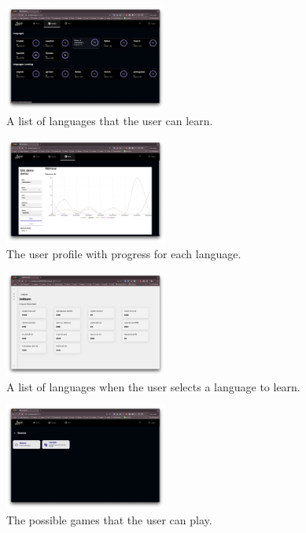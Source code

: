 \documentclass[12pt]{article}
\begin{document}
  \begin{figure}[!h]
    \centering
    \caption{
    A list of languages that the user can learn. 
    }
    \label{fig:site2}
    \includegraphics[width=0.475\textwidth]{assets/21.png}
  \end{figure}

    \begin{figure}[!h]
      \centering
      \caption{
      The user profile with progress for each language.
      }
      \label{fig:site3}
      \includegraphics[width=0.475\textwidth]{assets/22.png}
    \end{figure}

    \begin{figure}[!h]
      \centering
      \caption{
      A list of languages when the user selects a language to learn.
      }
      \label{fig:site4}
      \includegraphics[width=0.475\textwidth]{assets/25.png}
    \end{figure}

    \begin{figure}[!h]
      \centering
      \caption{
      The possible games that the user can play.
      }
      \label{fig:site5}
      \includegraphics[width=0.475\textwidth]{assets/5.png}
    \end{figure}
\end{document}
